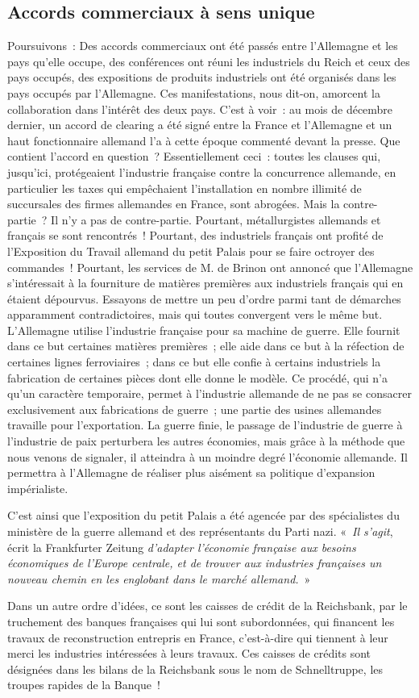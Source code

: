 \documentclass[french,twoside]{book} %
\begin{document}
\subsection[Accords commerciaux à sens unique]{Accords commerciaux à sens unique}
\noindent Poursuivons : Des accords commerciaux ont été passés entre l’Allemagne et les pays qu’elle occupe, des conférences ont réuni les industriels du Reich et ceux des pays occupés, des expositions de produits industriels ont été organisés dans les pays occupés par l’Allemagne. Ces manifestations, nous dit-on, amorcent la collaboration dans l’intérêt des deux pays. C’est à voir : au mois de décembre dernier, un accord de clearing a été signé entre la France et l’Allemagne et un haut fonctionnaire allemand l’a à cette époque commenté devant la presse. Que contient l’accord en question ? Essentiellement ceci : toutes les clauses qui, jusqu’ici, protégeaient l’industrie française contre la concurrence allemande, en particulier les taxes qui empêchaient l’installation en nombre illimité de succursales des firmes allemandes en France, sont abrogées. Mais la contre-partie ? Il n’y a pas de contre-partie. Pourtant, métallurgistes allemands et français se sont rencontrés ! Pourtant, des industriels français ont profité de l’Exposition du Travail allemand du petit Palais pour se faire octroyer des commandes ! Pourtant, les services de M. de Brinon ont annoncé que l’Allemagne s’intéressait à la fourniture de matières premières aux industriels français qui en étaient dépourvus. Essayons de mettre un peu d’ordre parmi tant de démarches apparamment contradictoires, mais qui toutes convergent vers le même but. L’Allemagne utilise l’industrie française pour sa machine de guerre. Elle fournit dans ce but certaines matières premières ; elle aide dans ce but à la réfection de certaines lignes ferroviaires ; dans ce but elle confie à certains industriels la fabrication de certaines pièces dont elle donne le modèle. Ce procédé, qui n’a qu’un caractère temporaire, permet à l’industrie allemande de ne pas se consacrer exclusivement aux fabrications de guerre ; une partie des usines allemandes travaille pour l’exportation. La guerre finie, le passage de l’industrie de guerre à l’industrie de paix perturbera les autres économies, mais grâce à la méthode que nous venons de signaler, il atteindra à un moindre degré l’économie allemande. Il permettra à l’Allemagne de réaliser plus aisément sa politique d’expansion impérialiste.\par
C’est ainsi que l’exposition du petit Palais a été agencée par des spécialistes du ministère de la guerre allemand et des représentants du Parti nazi. « \emph{Il s’agit}, écrit la Frankfurter Zeitung \emph{d’adapter l’économie française aux besoins économiques de l’Europe centrale, et de trouver aux industries françaises un nouveau chemin en les englobant dans le marché allemand.} »\par
Dans un autre ordre d’idées, ce sont les caisses de crédit de la Reichsbank, par le truchement des banques françaises qui lui sont subordonnées, qui financent les travaux de reconstruction entrepris en France, c’est-à-dire qui tiennent à leur merci les industries intéressées à leurs travaux. Ces caisses de crédits sont désignées dans les bilans de la Reichsbank sous le nom de Schnelltruppe, les troupes rapides de la Banque !
\end{document}
